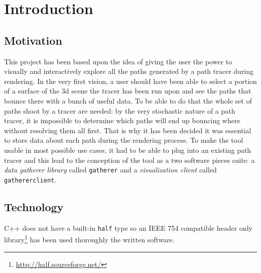 \chapter{Introduction}

\section{Motivation}
\label{motivation}
This project has been based upon the idea of giving the user the power to visually and interactively explore all the paths generated by a path tracer during rendering. In the very first vision, a user should have been able to select a portion of a surface of the 3d scene the tracer has been run upon and see the paths that bounce there with a bunch of useful data. To be able to do that the whole set of paths shoot by a tracer are needed: by the very stochastic nature of a path tracer, it is impossible to determine which paths will end up bouncing where without resolving them all first. That is why it has been decided it was essential to store data about each path during the rendering process. To make the tool usable in most possible use cases, it had to be able to plug into an existing path tracer and this lead to the conception of the tool as a two software pieces suite: a \textit{data gatherer library} called \texttt{gatherer} and a \textit{visualization client} called \texttt{gathererclient}.


\section{Technology}
\label{technology}

C++ does not have a built-in \texttt{half} type so an IEEE 754 compatible header only library\footnote{\url{http://half.sourceforge.net/}} has been used thoroughly the written software.